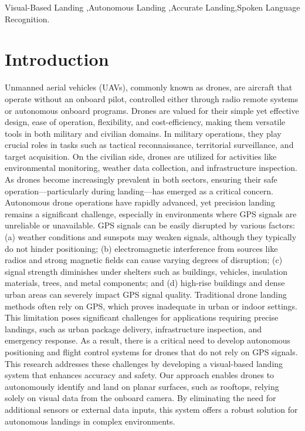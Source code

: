 \documentclass[3p,times]{elsarticle}
\begin{document}
\begin{frontmatter}
\begin{abstract}
        \end{abstract}

        \begin{keyword}
            Visual-Based Landing \sep Autonomous Landing \sep Accurate Landing\sep Spoken Language Recognition.
        \end{keyword}

    \end{frontmatter}

    \section{Introduction}
    Unmanned aerial vehicles (UAVs), commonly known as drones, are aircraft that operate without an onboard pilot, controlled either through radio remote systems or autonomous onboard programs. Drones are valued for their simple yet effective design, ease of operation, flexibility, and cost-efficiency, making them versatile tools in both military and civilian domains. In military operations, they play crucial roles in tasks such as tactical reconnaissance, territorial surveillance, and target acquisition. On the civilian side, drones are utilized for activities like environmental monitoring, weather data collection, and infrastructure inspection. As drones become increasingly prevalent in both sectors, ensuring their safe operation—particularly during landing—has emerged as a critical concern.\\Autonomous drone operations have rapidly advanced, yet precision landing remains a significant challenge, especially in environments where GPS signals are unreliable or unavailable. GPS signals can be easily disrupted by various factors: (a) weather conditions and sunspots may weaken signals, although they typically do not hinder positioning; (b) electromagnetic interference from sources like radios and strong magnetic fields can cause varying degrees of disruption; (c) signal strength diminishes under shelters such as buildings, vehicles, insulation materials, trees, and metal components; and (d) high-rise buildings and dense urban areas can severely impact GPS signal quality. Traditional drone landing methods often rely on GPS, which proves inadequate in urban or indoor settings. This limitation poses significant challenges for applications requiring precise landings, such as urban package delivery, infrastructure inspection, and emergency response. As a result, there is a critical need to develop autonomous positioning and flight control systems for drones that do not rely on GPS signals.\\
    This research addresses these challenges by developing a visual-based landing system that enhances accuracy and safety. Our approach enables drones to autonomously identify and land on planar surfaces, such as rooftops, relying solely on visual data from the onboard camera. By eliminating the need for additional sensors or external data inputs, this system offers a robust solution for autonomous landings in complex environments.
\end{document}
